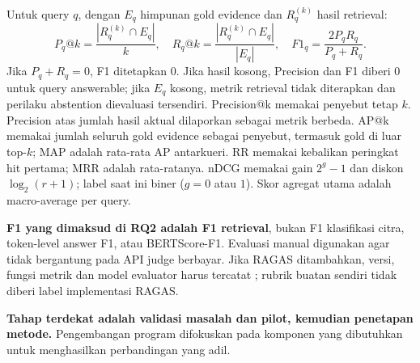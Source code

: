 \documentclass[11pt,a4paper]{article}
\newcommand{\heading}[1]{\vspace{5pt}{\large\bfseries #1}\par\vspace{1pt}}
\begin{document}
\vspace{6pt}
Untuk query $q$, dengan $E_q$ himpunan gold evidence dan $R_q^{(k)}$ hasil retrieval:
\[
 P_q@k=\frac{|R_q^{(k)}\cap E_q|}{k},\quad
 R_q@k=\frac{|R_q^{(k)}\cap E_q|}{|E_q|},\quad
 F1_q=\frac{2P_qR_q}{P_q+R_q}.
\]
Jika $P_q+R_q=0$, F1 ditetapkan 0. Jika hasil kosong, Precision dan F1 diberi 0 untuk query answerable; jika $E_q$ kosong, metrik retrieval tidak diterapkan dan perilaku abstention dievaluasi tersendiri. Precision@k memakai penyebut tetap $k$. Precision atas jumlah hasil aktual dilaporkan sebagai metrik berbeda. AP@k memakai jumlah seluruh gold evidence sebagai penyebut, termasuk gold di luar top-$k$; MAP adalah rata-rata AP antarkueri. RR memakai kebalikan peringkat hit pertama; MRR adalah rata-ratanya. nDCG memakai gain $2^{g}-1$ dan diskon $\log_2(r+1)$; label saat ini biner ($g=0$ atau $1$). Skor agregat utama adalah macro-average per query.

\textbf{F1 yang dimaksud di RQ2 adalah F1 retrieval}, bukan F1 klasifikasi citra, token-level answer F1, atau BERTScore-F1. Evaluasi manual digunakan agar tidak bergantung pada API judge berbayar. Jika RAGAS ditambahkan, versi, fungsi metrik dan model evaluator harus tercatat \cite{es}; rubrik buatan sendiri tidak diberi label implementasi RAGAS.

\clearpage
\heading{Tugas Berikutnya Setelah Mapping}
\textbf{Tahap terdekat adalah validasi masalah dan pilot, kemudian penetapan metode.} Pengembangan program difokuskan pada komponen yang dibutuhkan untuk menghasilkan perbandingan yang adil.
\end{document}
